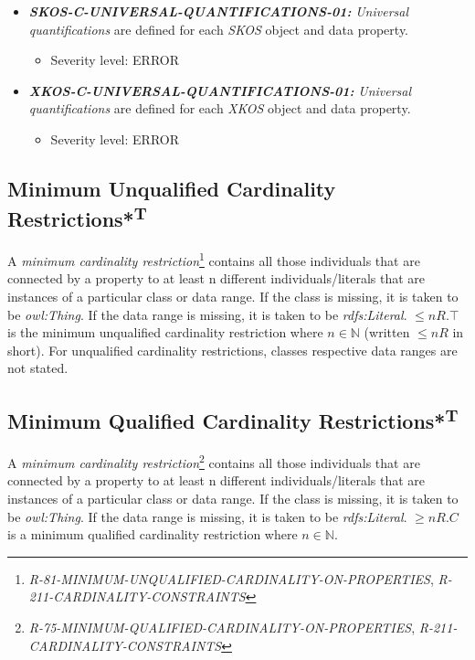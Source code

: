 \documentclass{llncs}
\begin{document}
\begin{itemize}
	\item \textbf{{\em SKOS-C-UNIVERSAL-QUANTIFICATIONS-01:}}
	\emph{Universal quantifications} are defined for each \emph{SKOS} object and data property.
	\begin{itemize}
		\item Severity level: ERROR
	\end{itemize}
\end{itemize}

\begin{itemize}
	\item \textbf{{\em XKOS-C-UNIVERSAL-QUANTIFICATIONS-01:}}
	\emph{Universal quantifications} are defined for each \emph{XKOS} object and data property.
	\begin{itemize}
		\item Severity level: ERROR
	\end{itemize}
\end{itemize}

\subsection{Minimum Unqualified Cardinality Restrictions*\textsuperscript{T}}

A \emph{minimum cardinality restriction}\footnote{{\em R-81-MINIMUM-UNQUALIFIED-CARDINALITY-ON-PROPERTIES}, {\em R-211-CARDINALITY-CONSTRAINTS}} contains all those individuals that are connected by a property to at least n different individuals/literals 
that are instances of a particular class or data range. If the class is missing, it is taken to be \emph{owl:Thing}. 
If the data range is missing, it is taken to be \emph{rdfs:Literal}.
$\leq n R. \top$ is the minimum unqualified cardinality restriction where $n \in \mathbb{N}$ (written $\leq  n R$ in short).
For unqualified cardinality restrictions, classes respective data ranges are not stated.

\subsection{Minimum Qualified Cardinality Restrictions*\textsuperscript{T}}

A \emph{minimum cardinality restriction}\footnote{{\em R-75-MINIMUM-QUALIFIED-CARDINALITY-ON-PROPERTIES}, {\em R-211-CARDINALITY-CONSTRAINTS}} contains all those individuals that are connected by a property to at least n different individuals/literals 
that are instances of a particular class or data range. If the class is missing, it is taken to be \emph{owl:Thing}. 
If the data range is missing, it is taken to be \emph{rdfs:Literal}.
$\geq n R. C$ is a minimum qualified cardinality restriction where $n \in \mathbb{N}$.
\end{document}
